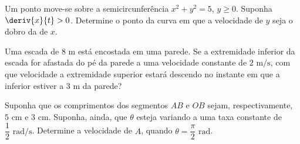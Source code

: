 \begin{exercicio}[15]
\label{ex:7.15.15}
Um ponto move-se sobre a semicircunferência $x^2 + y^2 = 5$, $y \ge 0$. Suponha $\deriv{x}{t} > 0$. Determine o ponto da curva em que a velocidade de $y$ seja o dobro da de $x$.
\end{exercicio}

\begin{exercicio}[16]
\label{ex:7.15.16}
Uma escada de $8\text{ m}$ está encostada em uma parede. Se a extremidade inferior da escada for afastada do pé da parede a uma velocidade constante de $2\text{ m/s}$, com que velocidade a extremidade superior estará descendo no instante em que a inferior estiver a $3\text{ m}$ da parede?
\end{exercicio}

\begin{exercicio}[17]
\label{ex:7.15.17}
Suponha que os comprimentos dos segmentos $AB$ e $OB$ sejam, respectivamente, $5\text{ cm}$ e $3\text{ cm}$. Suponha, ainda, que $\theta$ esteja variando a uma taxa constante de $\dfrac{1}{2}\text{ rad/s}$. Determine a velocidade de $A$, quando $\theta = \dfrac{\pi}{2}\text{ rad}$.
\begin{center}
\end{center}
\end{exercicio}


